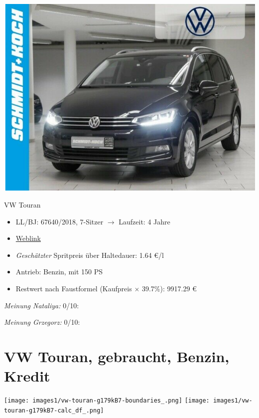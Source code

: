 \documentclass[landscape, DIV=99, 14pt]{scrartcl}
\begin{document}
\pagebreak
\begin{center}
\includegraphics[width=0.9\columnwidth]{cars/vw-touran-geb.png}

VW Touran
\end{center}

\begin{itemize}
    \item LL/BJ: 67640/2018, 7-Sitzer $\rightarrow$ Laufzeit: 4 Jahre
    \item \href{https://suchen.mobile.de/fahrzeuge/details.html?id=338082714}{Weblink}
    \item \emph{Gesch\"atzter} Spritpreis \"uber Haltedauer: 1.64 \euro{}/l
    \item Antrieb: Benzin, mit 150 PS
    \item Restwert nach Faustformel (Kaufpreis $\times$ 39.7\%): 9917.29 \euro{}
\end{itemize}

\begin{small}
\emph{Meinung Nataliya:} 0/10: 
        
\emph{Meinung Grzegorz:} 0/10: 
\end{small}

\pagebreak


\twocolumn

\section*{VW Touran, gebraucht, Benzin, Kredit}
\begin{center}
\texttt{[image: images1/vw-touran-g179kB7-boundaries\_.png]}
\null
\vspace{0.5cm}
\texttt{[image: images1/vw-touran-g179kB7-calc\_df\_.png]}
\end{center}
\end{document}
